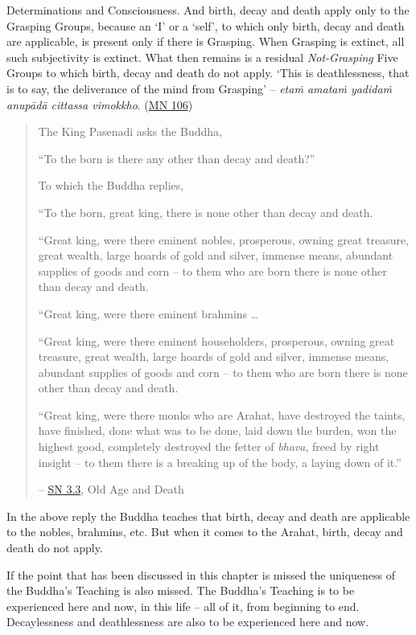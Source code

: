 Determinations and Consciousness. And birth, decay and death apply only to the Grasping Groups, because an `I' or a `self', to which only birth, decay and death are applicable, is present only if there is Grasping. When Grasping is extinct, all such subjectivity is extinct. What then remains is a residual \emph{Not-Grasping} Five Groups to which birth, decay and death do not apply. `This is deathlessness, that is to say, the deliverance of the mind from Grasping' -- \textit{etaṁ amataṁ yadidaṁ anupādā cittassa vimokkho}. (\href{https://suttacentral.net/mn106/en/sujato}{MN 106})

\begin{quote}
The King Pasenadi asks the Buddha,

``To the born is there any other than decay and death?''

To which the Buddha replies,

``To the born, great king, there is none other than decay and death.

``Great king, were there eminent nobles, prosperous, owning great treasure, great wealth, large hoards of gold and silver, immense means, abundant supplies of goods and corn -- to them who are born there is none other than decay and death.

``Great king, were there eminent brahmins \ldots\hspace{0pt}

``Great king, were there eminent householders, prosperous, owning great treasure, great wealth, large hoards of gold and silver, immense means, abundant supplies of goods and corn -- to them who are born there is none other than decay and death.

``Great king, were there monks who are Arahat, have destroyed the taints, have finished, done what was to be done, laid down the burden, won the highest good, completely destroyed the fetter of \textit{bhava}, freed by right insight -- to them there is a breaking up of the body, a laying down of it.''

 -- \href{https://suttacentral.net/sn3.3/en/sujato}{SN 3.3}, Old Age and Death
\end{quote}

In the above reply the Buddha teaches that birth, decay and death are applicable to the nobles, brahmins, etc. But when it comes to the Arahat, birth, decay and death do not apply.

If the point that has been discussed in this chapter is missed the uniqueness of the Buddha's Teaching is also missed. The Buddha's Teaching is to be experienced here and now, in this life -- all of it, from beginning to end. Decaylessness and deathlessness are also to be experienced here and now.
